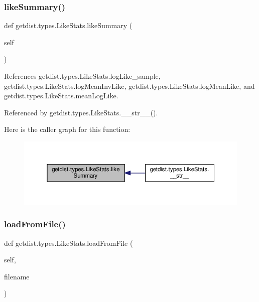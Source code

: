 \subsubsection{\texorpdfstring{like\+Summary()}{likeSummary()}}
{\footnotesize\ttfamily def getdist.\+types.\+Like\+Stats.\+like\+Summary (\begin{DoxyParamCaption}\item[{}]{self }\end{DoxyParamCaption})}



References getdist.\+types.\+Like\+Stats.\+log\+Like\+\_\+sample, getdist.\+types.\+Like\+Stats.\+log\+Mean\+Inv\+Like, getdist.\+types.\+Like\+Stats.\+log\+Mean\+Like, and getdist.\+types.\+Like\+Stats.\+mean\+Log\+Like.



Referenced by getdist.\+types.\+Like\+Stats.\+\_\+\+\_\+str\+\_\+\+\_\+().

Here is the caller graph for this function\+:
\nopagebreak
\begin{figure}[H]
\begin{center}
\leavevmode
\includegraphics[width=350pt]{classgetdist_1_1types_1_1LikeStats_a6aa2cc1ed178c43b46cdb529d9be5b1f_icgraph}
\end{center}
\end{figure}
\mbox{\label{classgetdist_1_1types_1_1LikeStats_a7d2796576ba424f62edee6ae05ce37a2}} 
\subsubsection{\texorpdfstring{load\+From\+File()}{loadFromFile()}}
{\footnotesize\ttfamily def getdist.\+types.\+Like\+Stats.\+load\+From\+File (\begin{DoxyParamCaption}\item[{}]{self,  }\item[{}]{filename }\end{DoxyParamCaption})}



